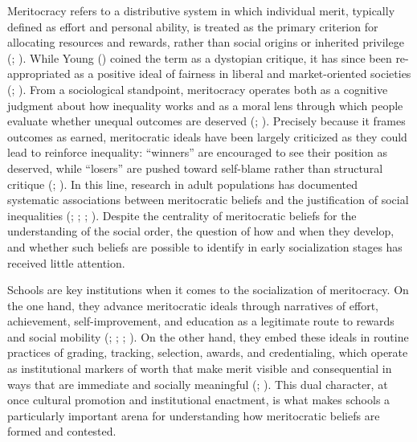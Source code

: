 \documentclass[
  13pt,
]{article}
\begin{document}
Meritocracy refers to a distributive system in which individual merit,
typically defined as effort and personal ability, is treated as the
primary criterion for allocating resources and rewards, rather than
social origins or inherited privilege
(;
). While Young
() coined the term as a dystopian
critique, it has since been re-appropriated as a positive ideal of
fairness in liberal and market-oriented societies
(;
).
From a sociological standpoint, meritocracy operates both as a cognitive
judgment about how inequality works and as a moral lens through which
people evaluate whether unequal outcomes are deserved
(;
). Precisely
because it frames outcomes as earned, meritocratic ideals have been
largely criticized as they could lead to reinforce inequality:
``winners'' are encouraged to see their position as deserved, while
``losers'' are pushed toward self-blame rather than structural critique
(;
). In this line,
research in adult populations has documented systematic associations
between meritocratic beliefs and the justification of social
inequalities (; ;
;
). Despite the centrality of meritocratic beliefs for the
understanding of the social order, the question of how and when they
develop, and whether such beliefs are possible to identify in early
socialization stages has received little attention.

Schools are key institutions when it comes to the socialization of
meritocracy. On the one hand, they advance meritocratic ideals through
narratives of effort, achievement, self-improvement, and education as a
legitimate route to rewards and social mobility
(;
;
;
). On the
other hand, they embed these ideals in routine practices of grading,
tracking, selection, awards, and credentialing, which operate as
institutional markers of worth that make merit visible and consequential
in ways that are immediate and socially meaningful
(;
). This dual
character, at once cultural promotion and institutional enactment, is
what makes schools a particularly important arena for understanding how
meritocratic beliefs are formed and contested.
\end{document}
